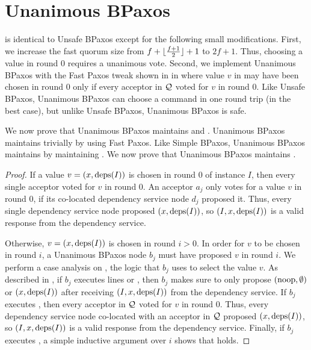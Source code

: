 \section{Unanimous BPaxos}
 is identical to Unsafe BPaxos except for the
following small modifications.  First, we increase the fast quorum size from
$f + \lfloor\frac{f + 1}{2}\rfloor + 1$ to $2f + 1$. Thus, choosing a value in round $0$ requires a
unanimous vote. Second, we implement Unanimous BPaxos with the Fast Paxos
tweak shown in  in  where value
$v$ in  may have been chosen in round $0$ only if
every acceptor in $\mathcal{Q}$ voted for $v$ in round $0$.
%
Like Unsafe BPaxos, Unanimous BPaxos can choose a command in one round trip (in
the best case), but unlike Unsafe BPaxos, Unanimous BPaxos is safe.

We now prove that Unanimous BPaxos maintains  and
. Unanimous BPaxos maintains
 trivially by using Fast Paxos. Like Simple BPaxos,
Unanimous BPaxos maintains  by maintaining
. We now prove that Unanimous BPaxos maintains
.

\begin{proof}
  If a value $v = (x, \text{deps}(I))$ is chosen in round $0$ of instance $I$, then
  every single acceptor voted for $v$ in round $0$. An acceptor $a_j$ only
  votes for a value $v$ in round $0$, if its co-located dependency service node
  $d_j$ proposed it. Thus, every single dependency service node proposed $(x,
  \text{deps}(I))$, so $(I, x, \text{deps}(I))$ is a valid response from the dependency
  service.

  Otherwise, $v = (x, \text{deps}(I))$ is chosen in round $i > 0$. In order for $v$
  to be chosen in round $i$, a Unanimous BPaxos node $b_j$ must have proposed
  $v$ in round $i$. We perform a case analysis on , the
  logic that $b_j$ uses to select the value $v$.
  As described in , if $b_j$ executes lines
   or , then
  $b_j$ makes sure to only propose $(\text{noop}, \emptyset)$ or $(x, \text{deps}(I))$
  after receiving $(I, x, \text{deps}(I))$ from the dependency service.
  If $b_j$ executes , then every acceptor in
  $\mathcal{Q}$ voted for $v$ in round $0$. Thus, every dependency service node
  co-located with an acceptor in $\mathcal{Q}$ proposed $(x, \text{deps}(I))$, so $(I, x,
  \text{deps}(I))$ is a valid response from the dependency service.
  Finally, if $b_j$ executes , a simple
  inductive argument over $i$ shows that  holds.
\end{proof}

